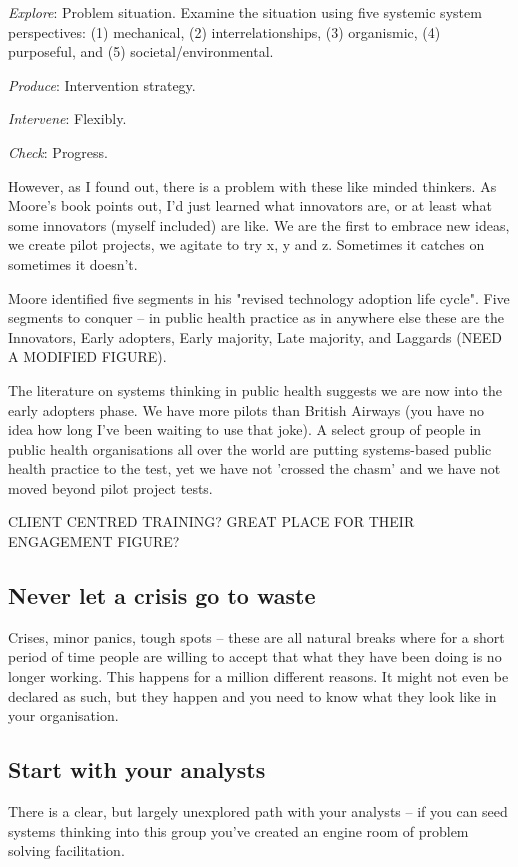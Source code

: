 \emph{Explore}: Problem situation. Examine the situation using five systemic system perspectives: (1) mechanical, (2) interrelationships, (3) organismic, (4) purposeful, and (5) societal/environmental.

\emph{Produce}: Intervention strategy.

\emph{Intervene}: Flexibly.

\emph{Check}: Progress. 

However, as I found out, there is a problem with these like minded thinkers. As Moore's book points out, I'd just learned what innovators are, or at least what some innovators (myself included) are like. We are the first to embrace new ideas, we create pilot projects, we agitate to try x, y and z. Sometimes it catches on sometimes it doesn't.

Moore identified five segments in his "revised technology adoption life cycle". Five segments to conquer -- in public health practice as in anywhere else these are the Innovators, Early adopters, Early majority, Late majority, and Laggards (NEED A MODIFIED FIGURE).

The literature on systems thinking in public health suggests we are now into the early adopters phase. We have more pilots than British Airways (you have no idea how long I've been waiting to use that joke). A select group of people in public health organisations all over the world are putting systems-based public health practice to the test, yet we have not 'crossed the chasm' and we have not moved beyond pilot project tests.

CLIENT CENTRED TRAINING? GREAT PLACE FOR THEIR ENGAGEMENT FIGURE?

\subsection{Never let a crisis go to waste}
Crises, minor panics, tough spots -- these are all natural breaks where for a short period of time people are willing to accept that what they have been doing is no longer working. This happens for a million different reasons. It might not even be declared as such, but they happen and you need to know what they look like in your organisation.

\subsection{Start with your analysts}
There is a clear, but largely unexplored path with your analysts -- if you can seed systems thinking into this group you've created an engine room of problem solving facilitation.

